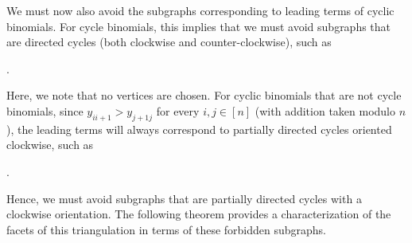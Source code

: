 \documentclass[11pt]{article}
\theoremstyle{definition}
\numberwithin{equation}{section}
\begin{document}
We must now also avoid the subgraphs corresponding to leading terms of cyclic binomials. 
For cycle binomials, this implies that we must avoid subgraphs that are directed cycles (both clockwise and counter-clockwise), such as
\begin{center}
\hspace{1in}
.
\end{center}
Here, we note that no vertices are chosen. 
For cyclic binomials that are not cycle binomials, since $y_{ii+1} > y_{j+1j}$ for every $i,j\in[n]$ (with addition taken modulo $n$), the leading terms will always correspond to partially directed cycles oriented clockwise, such as
\begin{center}
.
\end{center}
Hence, we must avoid subgraphs that are partially directed cycles with a clockwise orientation.
The following theorem provides a characterization of the facets of this triangulation in terms of these forbidden subgraphs.
\end{document}
